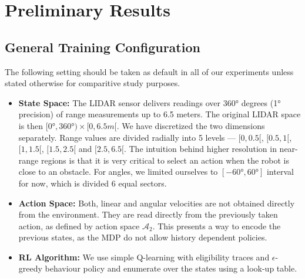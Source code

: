 \documentclass{article}
\begin{document}
\section{Preliminary Results}
\subsection{General Training Configuration}
The following setting should be taken as default in all of our experiments unless stated otherwise for comparitive study purposes.
\begin{itemize}
\item {\bf State Space:} The LIDAR sensor delivers readings over \ang{360} degrees (\ang{1} precision) of range measurements up to 6.5 meters. The original LIDAR space is then $[\ang{0}, \ang{360}) \times [0, 6.5m[$. We have discretized the two dimensions separately. Range values are divided radially into 5 levels --- $[0, 0.5[$, $[0.5, 1[$, $[1, 1.5[$, $[1.5, 2.5[$ and $[2.5, 6.5[$. The intuition behind higher resolution in near-range regions is that it is very critical to select an action when the robot is close to an obstacle. For angles, we limited ourselves to $[\ang{-60}, \ang{60}]$ interval for now, which is divided 6 equal sectors.
\item {\bf Action Space: } Both, linear and angular velocities are not obtained directly from the environment. They are read directly from the previously taken action, as defined by action space $\mathcal{A}_2$. This presents a way to encode the previous states, as the MDP do not allow history dependent policies.
\item {\bf RL Algorithm:} We use simple Q-learning with eligibility traces and $\epsilon$-greedy behaviour policy and enumerate over the states using a look-up table.
\end{itemize}
\end{document}
